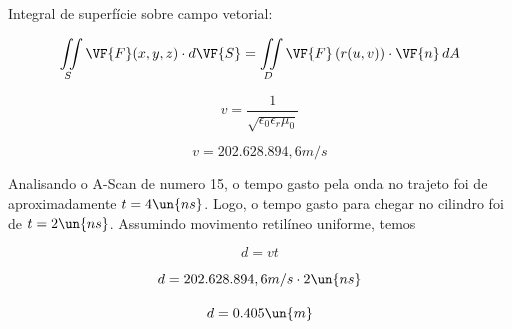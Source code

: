 Integral de superfície sobre campo vetorial:

\[ \iint\limits_S \VF{F}(x,y,z) \cdot d\VF{S} = \iint\limits_D \VF{F} \left(r(u, v)\right) \cdot \VF{n} \, dA \]


\[ v = \frac{1}{\sqrt{\epsilon_0 \epsilon_r \mu_0}} \]

\[ v = 202.628.894,6 m/s \]

Analisando o A-Scan de numero 15, o tempo gasto pela onda no trajeto 
foi de aproximadamente $t = 4 \un{ns}$. Logo, o tempo gasto para chegar no cilindro foi de 
$t = 2 \un{ns}$. Assumindo movimento retilíneo uniforme, temos

\[ d = v t \]

\[ d = 202.628.894,6 m/s \cdot 2 \un{ns} \]

\[ d = 0.405 \un{m} \]



